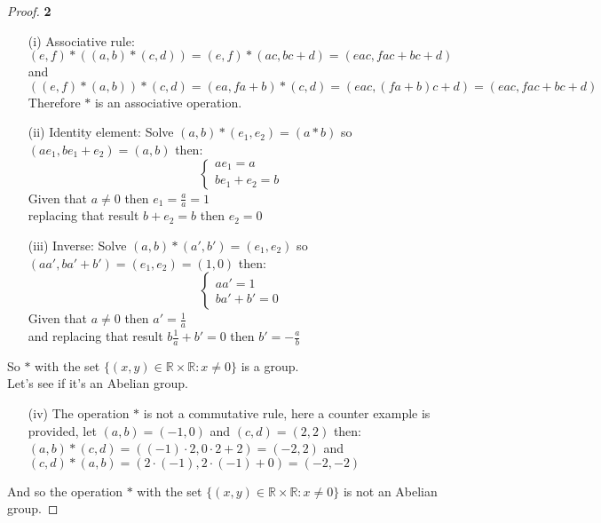 \documentclass[11pt]{article}
\begin{document}
		\begin{proof}{\textbf{2}}
		\begin{itemize}
			\item [(i)] Associative rule:\\
			$(e,f)*((a, b)*(c,d)) = (e,f)*(ac,bc+d) = (eac,fac+bc+d)$ and \\
			$((e,f)*(a,b))*(c,d) = (ea,fa+b)*(c,d) = (eac,(fa+b)c+d) = (eac,fac+bc+d)$\\
			Therefore $*$ is an associative operation.
			
			\item [(ii)] Identity element: Solve $(a,b) *(e_1, e_2) = (a*b)$ so\\
			$(ae_1, be_1+e_2) = (a,b)$ then:
			\begin{equation*}
    			\begin{cases}
      				ae_1 = a\\
      				be_1+e_2=b
    			\end{cases}
			\end{equation*}
			Given that $a \neq 0$ then $e_1 = \frac{a}{a} = 1$\\
			replacing that result $b+e_2 = b$ then $e_2 = 0$
			
			\item [(iii)] Inverse: Solve $(a,b)*(a',b')=(e_1,e_2)$ so\\
			$(aa',ba'+b') = (e_1,e_2) = (1,0)$ then:
			\begin{equation*}
    			\begin{cases}
      				aa' = 1\\
      				ba'+b'=0
    			\end{cases}
			\end{equation*}
			Given that $a \neq 0$ then $a' = \frac{1}{a}$ \\
			and replacing that result $b\frac{1}{a} + b'=0$ then $b' = -\frac{a}{b}$
		\end{itemize}
		So $*$ with the set $\{(x,y) \in \mathbb{R} \times \mathbb{R}: x \neq 0\}$ is a group.\\
		Let's see if it's an Abelian group.
			\begin{itemize}
			\item [(iv)] The operation $*$ is not a commutative rule, here a counter example is provided, let $(a,b)=(-1,0)$ and $(c,d)=(2,2)$ then:\\
			$(a,b)*(c,d) = ((-1) \cdot 2, 0 \cdot 2 + 2) = (-2,2)$ and \\
			$(c,d)*(a,b) = (2 \cdot (-1), 2 \cdot (-1) + 0)=(-2,-2)$\\ 
			\end{itemize}
		And so the operation $*$ with the set $\{(x,y) \in \mathbb{R} \times \mathbb{R}: x \neq 0\}$ is not an Abelian group.
		\end{proof}
\end{document}
